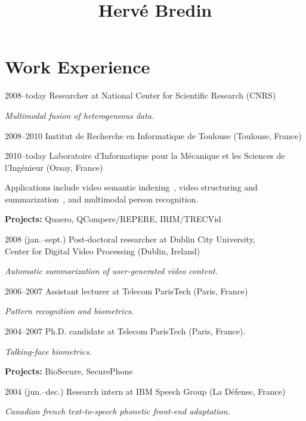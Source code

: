\documentclass{simplecv}
\begin{document}


\title{Herv\'{e} Bredin}

\maketitle


\section{Work Experience}

\begin{topic}
\item[2008--today] Researcher at National Center for Scientific Research (CNRS)

\emph{Multimodal fusion of heterogeneous data.} 

\begin{topic}
	\item[2008--2010] Institut de Recherche en Informatique de Toulouse (Toulouse, France)
	\item[2010--today] Laboratoire d'Informatique pour la M\'{e}canique et les Sciences de l'Ing\'{e}nieur (Orsay, France)
\end{topic}

Applications include video semantic indexing~\cite{Bredin2012a}, video structuring and summarization~\cite{Bredin2012}, and multimodal person recognition.

\textbf{Projects:} Quaero, QCompere/REPERE, IRIM/TRECVid

\item[2008 (jan.--sept.)] Post-doctoral researcher at Dublin City University,\\ Center for Digital Video Processing (Dublin, Ireland)

\emph{Automatic summarization of user-generated video content.}

\item[2006--2007] Assistant lecturer at Telecom ParisTech (Paris, France)

\emph{Pattern recognition and biometrics.}

\item[2004--2007] Ph.D. candidate at Telecom ParisTech (Paris, France).

\emph{Talking-face biometrics.}

\textbf{Projects:} BioSecure, SecurePhone 

\item[2004 (jun.--dec.)] Research intern at IBM Speech Group (La D\'{e}fense, France)

\emph{Canadian french text-to-speech phonetic front-end adaptation.}
\end{topic}
\end{document}
